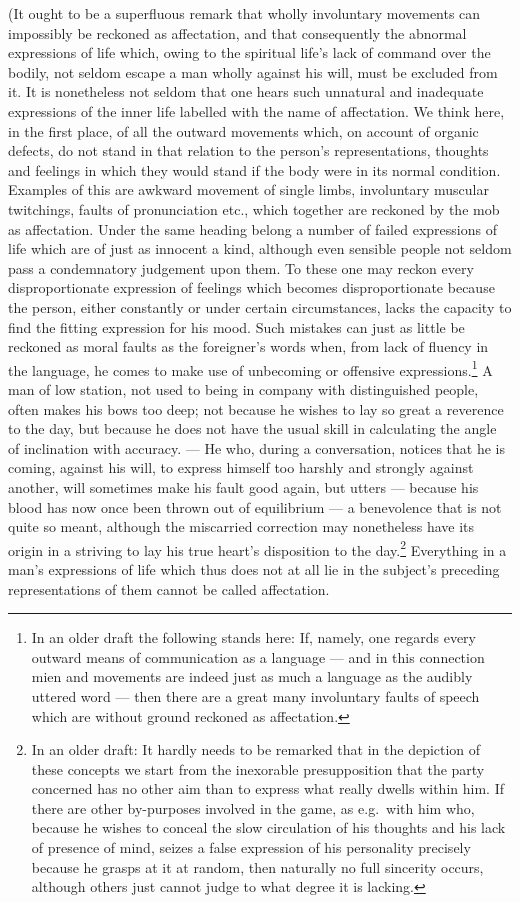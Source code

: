 \documentclass[12pt]{article}
\newcommand{\opage}[1]{\marginnote{\footnotesize\textit{[#1]}}}
\begin{document}
(It ought to be a superfluous remark that wholly invol\opage{167}untary movements can impossibly be reckoned as affectation, and that consequently the abnormal expressions of life which, owing to the spiritual life's lack of command over the bodily, not seldom escape a man wholly against his will, must be excluded from it. It is nonetheless not seldom that one hears such unnatural and inadequate expressions of the inner life labelled with the name of affectation. We think here, in the first place, of all the outward movements which, on account of organic defects, do not stand in that relation to the person's representations, thoughts and feelings in which they would stand if the body were in its normal condition. Examples of this are awkward movement of single limbs, involuntary muscular twitchings, faults of pronunciation etc., which together are reckoned by the mob as affectation. Under the same heading belong a number of failed expressions of life which are of just as innocent a kind, although even sensible people not seldom pass a condemnatory judgement upon them. To these one may reckon every disproportionate expression of feelings which becomes disproportionate because the person, either constantly or under certain circumstances, lacks the capacity to find the fitting expression for his mood. Such mistakes can just as little be reckoned as moral faults as the foreigner's words when, from lack of fluency in the language, he comes to make use of unbecoming or offensive expressions.\footnote{In an older draft the following stands here: If, namely, one regards every outward means of communication as a language --- and in this connection mien and movements are indeed just as much a language as the audibly uttered word --- then there are a great many involuntary faults of speech which are without ground reckoned as affectation.} A man of low station, not used to being in company with distinguished people, often makes his bows too deep; not because he wishes to lay so great a reverence to the day, but because he does not have the usual skill in calculating the angle of inclination \opage{168}with accuracy. --- He who, during a conversation, notices that he is coming, against his will, to express himself too harshly and strongly against another, will sometimes make his fault good again, but utters --- because his blood has now once been thrown out of equilibrium --- a benevolence that is not quite so meant, although the miscarried correction may nonetheless have its origin in a striving to lay his true heart's disposition to the day.\footnote{In an older draft: It hardly needs to be remarked that in the depiction of these concepts we start from the inexorable presupposition that the party concerned has no other aim than to express what really dwells within him. If there are other by-purposes involved in the game, as e.g.\ with him who, because he wishes to conceal the slow circulation of his thoughts and his lack of presence of mind, seizes a false expression of his personality precisely because he grasps at it at random, then naturally no full sincerity occurs, although others just cannot judge to what degree it is lacking.} Everything in a man's expressions of life which thus does not at all lie in the subject's preceding representations of them cannot be called affectation. 
\end{document}
